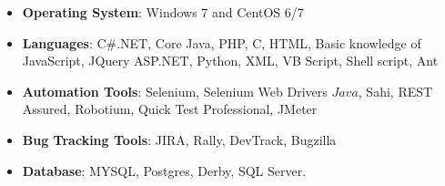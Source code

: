 \begin{cvparagraph}
\begin{itemize}
\item {\textbf{Operating System}: Windows 7 and CentOS 6/7}
\item {\textbf{Languages}: C\#.NET, Core Java, PHP, C\+\+, HTML, Basic knowledge of JavaScript, JQuery ASP.NET, Python, XML, VB Script, Shell script, Ant}
\item {\textbf{Automation  Tools}: Selenium, Selenium Web Drivers \(Java\), Sahi, REST Assured, Robotium, Quick Test Professional, JMeter}
\item {\textbf{Bug Tracking Tools}: JIRA, Rally, DevTrack, Bugzilla }
\item {\textbf{Database}: MYSQL, Postgres, Derby, SQL Server.}
\end{itemize}
\end{cvparagraph}